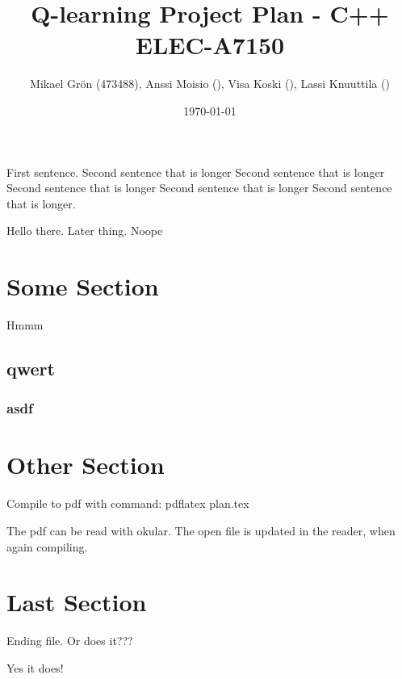 \documentclass{article}
\author{Mikael Grön (473488), Anssi Moisio (),
	Visa Koski (), Lassi Knuuttila ()}
\title{Q-learning Project Plan - C++ ELEC-A7150}
\date{\today}
\begin{document}
\maketitle

First sentence.
Second sentence that is longer Second sentence that
is longer Second sentence that is longer Second
sentence that is longer Second sentence that is longer.

Hello there. Later thing.
Noope

\section{Some Section}
Hmmm
\subsection{qwert}
\subsubsection{asdf}
\section{Other Section}
Compile to pdf with command: pdflatex plan.tex

The pdf can be read with okular.
The open file is updated in the reader, when again compiling.

\newpage
\section{Last Section}
Ending file. Or does it???

Yes it does!
\end{document}
